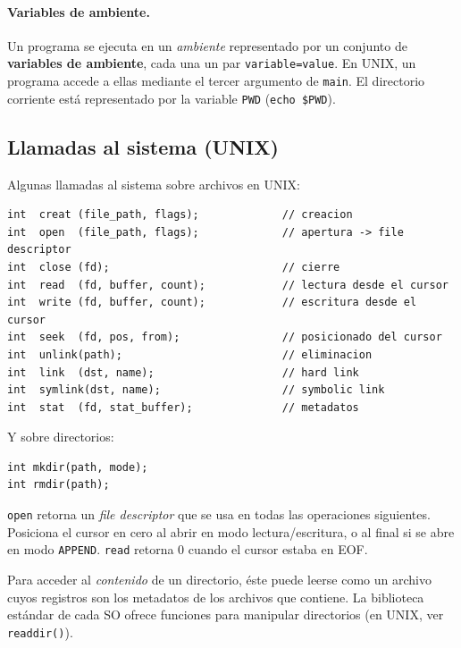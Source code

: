 \documentclass[11pt,a4paper]{article}
\begin{document}
\paragraph{Variables de ambiente.}
Un programa se ejecuta en un \emph{ambiente} representado por un
conjunto de \textbf{variables de ambiente}, cada una un par
\verb|variable=value|. En UNIX, un programa accede a ellas mediante el
tercer argumento de \texttt{main}. El directorio corriente está
representado por la variable \texttt{PWD} (\verb|echo $PWD|).

\subsection{Llamadas al sistema (UNIX)}

Algunas llamadas al sistema sobre archivos en UNIX:

\begin{lstlisting}[style=cstyle]
int  creat (file_path, flags);             // creacion
int  open  (file_path, flags);             // apertura -> file descriptor
int  close (fd);                           // cierre
int  read  (fd, buffer, count);            // lectura desde el cursor
int  write (fd, buffer, count);            // escritura desde el cursor
int  seek  (fd, pos, from);                // posicionado del cursor
int  unlink(path);                         // eliminacion
int  link  (dst, name);                    // hard link
int  symlink(dst, name);                   // symbolic link
int  stat  (fd, stat_buffer);              // metadatos
\end{lstlisting}

Y sobre directorios:

\begin{lstlisting}[style=cstyle]
int mkdir(path, mode);
int rmdir(path);
\end{lstlisting}

\begin{idea}
\texttt{open} retorna un \emph{file descriptor} que se usa en todas las
operaciones siguientes. Posiciona el cursor en cero al abrir en modo
lectura/escritura, o al final si se abre en modo \texttt{APPEND}.
\texttt{read} retorna 0 cuando el cursor estaba en EOF.
\end{idea}

Para acceder al \emph{contenido} de un directorio, éste puede leerse
como un archivo cuyos registros son los metadatos de los archivos que
contiene. La biblioteca estándar de cada SO ofrece funciones para
manipular directorios (en UNIX, ver \texttt{readdir()}).
\end{document}
